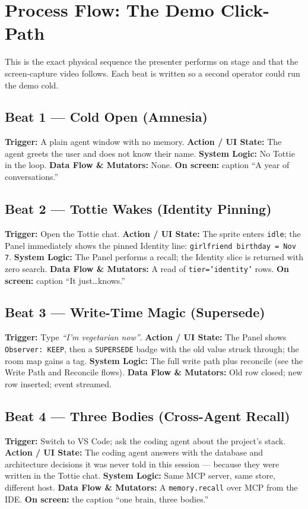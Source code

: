 \chapter{Process Flow: The Demo Click-Path}
This is the exact physical sequence the presenter performs on stage and that the screen-capture
video follows. Each beat is written so a second operator could run the demo cold.

\section{Beat 1 --- Cold Open (Amnesia)}
\textbf{Trigger:} A plain agent window with no memory.
\textbf{Action / UI State:} The agent greets the user and does not know their name.
\textbf{System Logic:} No Tottie in the loop.
\textbf{Data Flow \& Mutators:} None.
\textbf{On screen:} caption ``A year of conversations.''

\section{Beat 2 --- Tottie Wakes (Identity Pinning)}
\textbf{Trigger:} Open the Tottie chat.
\textbf{Action / UI State:} The sprite enters \texttt{idle}; the Panel immediately shows the pinned
Identity line: \texttt{girlfriend birthday = Nov 7}.
\textbf{System Logic:} The Panel performs a recall; the Identity slice is returned with zero search.
\textbf{Data Flow \& Mutators:} A read of \texttt{tier='identity'} rows.
\textbf{On screen:} caption ``It just\ldots knows.''

\section{Beat 3 --- Write-Time Magic (Supersede)}
\textbf{Trigger:} Type \emph{``I'm vegetarian now''}.
\textbf{Action / UI State:} The Panel shows \texttt{Observer: KEEP}, then a \texttt{SUPERSEDE} badge
with the old value struck through; the room map gains a tag.
\textbf{System Logic:} The full write path plus reconcile (see the Write Path and Reconcile flows).
\textbf{Data Flow \& Mutators:} Old row closed; new row inserted; event streamed.

\section{Beat 4 --- Three Bodies (Cross-Agent Recall)}
\textbf{Trigger:} Switch to VS Code; ask the coding agent about the project's stack.
\textbf{Action / UI State:} The coding agent answers with the database and architecture decisions it
was never told in this session --- because they were written in the Tottie chat.
\textbf{System Logic:} Same MCP server, same store, different host.
\textbf{Data Flow \& Mutators:} A \texttt{memory.recall} over MCP from the IDE.
\textbf{On screen:} the caption ``one brain, three bodies.''

